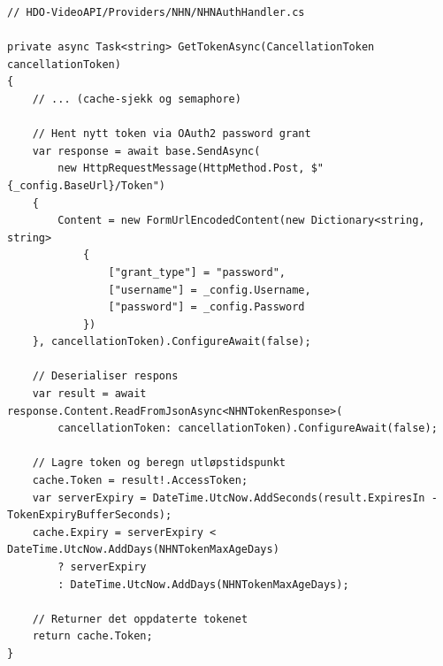 \begin{lstlisting}[language={[Sharp]C}, label=lst:nhn-token-cache, caption={Token-henting i \texttt{NHNAuthHandler}}]
// HDO-VideoAPI/Providers/NHN/NHNAuthHandler.cs

private async Task<string> GetTokenAsync(CancellationToken cancellationToken)
{
    // ... (cache-sjekk og semaphore)

    // Hent nytt token via OAuth2 password grant
    var response = await base.SendAsync(
        new HttpRequestMessage(HttpMethod.Post, $"{_config.BaseUrl}/Token")
    {
        Content = new FormUrlEncodedContent(new Dictionary<string, string>
            {
                ["grant_type"] = "password",
                ["username"] = _config.Username,
                ["password"] = _config.Password
            })
    }, cancellationToken).ConfigureAwait(false);

    // Deserialiser respons
    var result = await response.Content.ReadFromJsonAsync<NHNTokenResponse>(
        cancellationToken: cancellationToken).ConfigureAwait(false);

    // Lagre token og beregn utløpstidspunkt
    cache.Token = result!.AccessToken;
    var serverExpiry = DateTime.UtcNow.AddSeconds(result.ExpiresIn - TokenExpiryBufferSeconds);
    cache.Expiry = serverExpiry < DateTime.UtcNow.AddDays(NHNTokenMaxAgeDays)
        ? serverExpiry
        : DateTime.UtcNow.AddDays(NHNTokenMaxAgeDays);

    // Returner det oppdaterte tokenet
    return cache.Token;
}
\end{lstlisting}